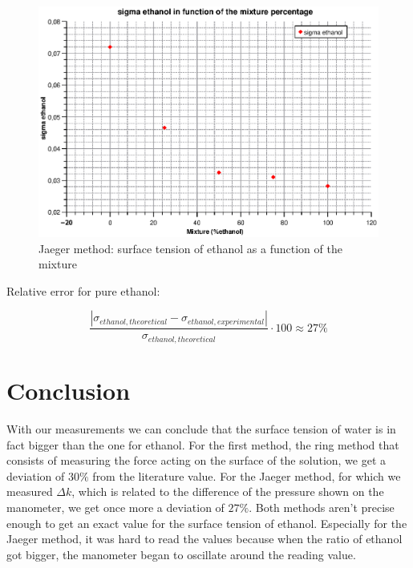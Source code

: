 \documentclass{scrartcl}
\begin{document}
\begin{figure}[h]
    \centering
    \includegraphics[width=12cm]{BubbleMethodSigmaEthanol.eps}
    \caption{Jaeger method: surface tension of ethanol as a function of the mixture}
    \label{fig:7}
\end{figure}

Relative error for pure ethanol:

\begin{equation}
    \frac{|\sigma_{ethanol,theoretical}-\sigma_{ethanol,experimental}|}{\sigma_{ethanol,theoretical}} \cdot 100 \approx 27 \%
\end{equation}


\section{Conclusion}
With our measurements we can conclude that the surface tension of water is in fact bigger than the one for ethanol. For the first method, the ring method that consists of measuring the force acting on the surface of the solution, we get a deviation of $30\%$ from the literature value. For the Jaeger method, for which we measured $\Delta k$, which is related to the difference of the pressure shown on the manometer, we get once more a deviation of $27\%$. Both methods aren't precise enough to get an exact value for the surface tension of ethanol. Especially for the Jaeger method, it was hard to read the values because when the ratio of ethanol got bigger, the manometer began to oscillate around the reading value.
\end{document}
